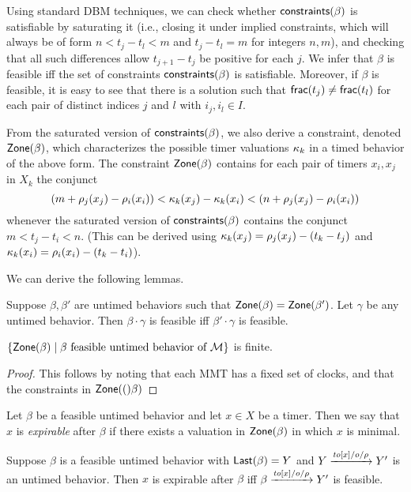 Using standard DBM techniques, we can check whether $\mathsf{constraints}({\beta})$ is satisfiable by saturating it (i.e., closing it under implied constraints, which
will always be of form
$n < t_j - t_l < m$ and $t_j - t_l = m$ for integers $n,m$), and checking that
all such differences allow $t_{j+1} - t_j$ be positive for each $j$.
We infer that $\beta$ is feasible iff the set of constraints $\mathsf{constraints}({\beta})$ is satisfiable.
Moreover, if $\beta$ is feasible, it is easy to see that there is a solution
such that $\mathsf{frac}({t_j}) \neq \mathsf{frac}({t_l})$ for each pair of distinct indices $j$ and $l$ with $i_j, i_l \in I$.

From the saturated version of $\mathsf{constraints}({\beta})$, we also derive a constraint,
denoted $\mathsf{Zone}({\beta})$,
which characterizes the possible timer valuations $\kappa_k$ in a timed
behavior of the above form.  The constraint $\mathsf{Zone}({\beta})$
contains for each pair of timers $x_i,x_j$ in $X_k$ the conjunct
\[
(m + \rho_j(x_j) - \rho_i(x_i)) < \kappa_k(x_j) -\kappa_k(x_i) < (n + \rho_j(x_j) - \rho_i(x_i))
\]
whenever the saturated version of $\mathsf{constraints}({\beta})$ contains the conjunct
\(
m < t_j - t_i < n
\).
(This can be derived using
$\kappa_k(x_j) = \rho_j(x_j) - (t_k - t_j)$
and
$\kappa_k(x_i) = \rho_i(x_i) - (t_k - t_i)$).

We can derive the following lemmas.

\begin{lemma}
\label{lemma: feasibility concatenation}
Suppose $\beta, \beta'$ are untimed behaviors such that
$\mathsf{Zone}({\beta}) = \mathsf{Zone}({\beta'})$. Let $\gamma$ be any untimed behavior.
Then $\beta \cdot \gamma$ is feasible iff $\beta' \cdot \gamma$ is feasible.
\end{lemma}

\begin{lemma}
\label{lemma finitely many zones}
$\{ \mathsf{Zone}({\beta}) \mid \beta \mbox{ feasible untimed behavior of } {\mathcal M} \}$ is finite.
\end{lemma}
\begin{proof}
  This follows by noting that each MMT has a fixed set of clocks, and that
  the constraints in $\mathsf{Zone}({(})\beta)$ 
\end{proof}

Let $\beta$ be a feasible untimed behavior and let $x \in X$ be a timer. Then we say that $x$ is \emph{expirable} after $\beta$
if there exists a valuation in $\mathsf{Zone}({\beta})$ in which $x$ is minimal.

\begin{lemma}
\label{expirable}
Suppose $\beta$ is a feasible untimed behavior with $\mathsf{Last}({\beta}) = Y$ and $Y \xrightarrow{\mathit{to}[x]/o/\rho} Y'$ is an untimed behavior.
Then $x$ is expirable after $\beta$ iff $\beta \xrightarrow{\mathit{to}[x]/o/\rho} Y'$ is feasible.
\end{lemma}



